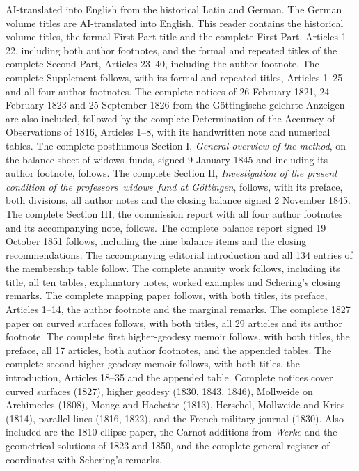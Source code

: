 \thispagestyle{empty}\begin{center}\vspace*{-.65in}{\Large\bfseries Carl Friedrich Gauss\par}\end{center}\smallskip\begingroup\small\setlength{\baselineskip}{11.0pt}\noindent AI-translated into English from the historical Latin and German. The German volume titles are AI-translated into English. This reader contains the historical volume titles, the formal First Part title and the complete First Part, Articles 1--22, including both author footnotes, and the formal and repeated titles of the complete Second Part, Articles 23--40, including the author footnote. The complete Supplement follows, with its formal and repeated titles, Articles 1--25 and all four author footnotes. The complete notices of 26 February 1821, 24 February 1823 and 25 September 1826 from the Göttingische gelehrte Anzeigen are also included, followed by the complete Determination of the Accuracy of Observations of 1816, Articles 1--8, with its handwritten note and numerical tables. The complete posthumous Section I, \textit{General overview of the method}, on the balance sheet of widows\textquotesingle\ funds, signed 9 January 1845 and including its author footnote, follows. The complete Section II, \textit{Investigation of the present condition of the professors\textquotesingle\ widows\textquotesingle\ fund at Göttingen}, follows, with its preface, both divisions, all author notes and the closing balance signed 2 November 1845. The complete Section III, the commission report with all four author footnotes and its accompanying note, follows. The complete balance report signed 19 October 1851 follows, including the nine balance items and the closing recommendations. The accompanying editorial introduction and all 134 entries of the membership table follow. The complete annuity work follows, including its title, all ten tables, explanatory notes, worked examples and Schering's closing remarks. The complete mapping paper follows, with both titles, its preface, Articles 1--14, the author footnote and the marginal remarks. The complete 1827 paper on curved surfaces follows, with both titles, all 29 articles and its author footnote. The complete first higher-geodesy memoir follows, with both titles, the preface, all 17 articles, both author footnotes, and the appended tables. The complete second higher-geodesy memoir follows, with both titles, the introduction, Articles 18--35 and the appended table. Complete notices cover curved surfaces (1827), higher geodesy (1830, 1843, 1846), Mollweide on Archimedes (1808), Monge and Hachette (1813), Herschel, Mollweide and Kries (1814), parallel lines (1816, 1822), and the French military journal (1830). Also included are the 1810 ellipse paper, the Carnot additions from \textit{Werke} and the geometrical solutions of 1823 and 1850, and the complete general register of coordinates with Schering’s remarks. 